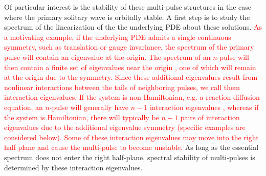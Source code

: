 \documentclass[12pt]{elsarticle}
\newcommand{\revised}[1]{ \textcolor{red}{#1} }
\begin{document}
Of particular interest is the stability of these multi-pulse structures in the case where the primary solitary wave is orbitally stable. A first step is to study the spectrum of the linearization of the the underlying PDE about these solutions. \revised{As a motivating example, if the underlying PDE admits a single continuous symmetry, such as translation or gauge invariance, the spectrum of the primary pulse will contain an eigenvalue at the origin. The spectrum of an $n$-pulse will then contain a finite set of eigenvalues near the origin \cite{Alexander1990,Sandstede1998}, one of which will remain at the origin due to the symmetry. Since these additional eigenvalues result from nonlinear interactions between the tails of neighboring pulses, we call them interaction eigenvalues. If the system is non-Hamiltonian, e.g. a reaction-diffusion equation, an $n$-pulse will generally have $n-1$ interaction eigenvalues \cite{Sandstede1998}, whereas if the system is Hamiltonian, there will typically be $n-1$ pairs of interaction eigenvalues \cite{Kapitula2020, Parker2020,Pelinovsky2007} due to the additional eigenvalue symmetry \cite{Kapitula2013} (specific examples are considered below). Some of these interaction eigenvalues may move into the right half plane and cause the multi-pulse to become unstable.} As long as the essential spectrum does not enter the right half-plane, spectral stability of multi-pulses is determined by these interaction eigenvalues.
\end{document}
